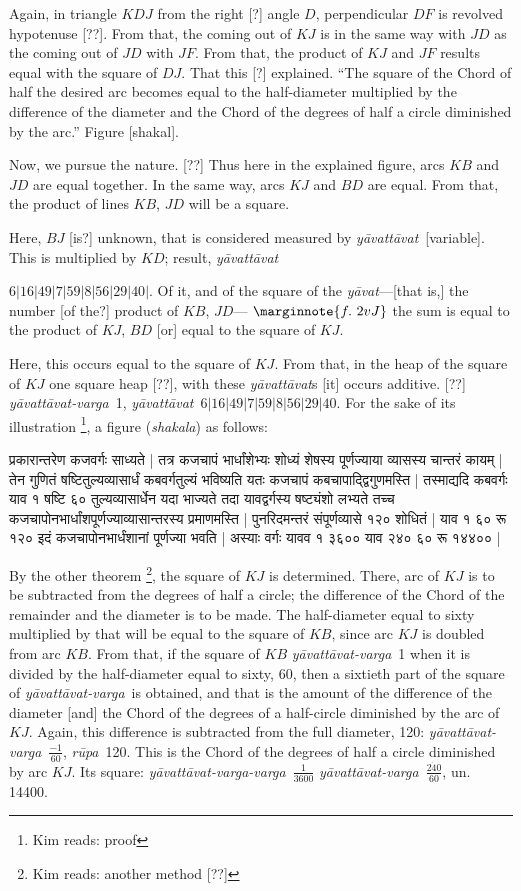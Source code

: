 \documentclass[12pt]{book}
\def\ya{\textit{y\=avat\-t\=avat}}
\def\yava{\textit{y\=avat\-t\=avat-varga}}
\def\yavava{\textit{y\=avat\-t\=avat-varga-varga}}
\def\ru{\textit{r\=upa}}
\begin{document}
\newpage

Again, in triangle $KDJ$ from the right [?] angle $D$, perpendicular $DF$ 
is revolved hypotenuse [??].  From that, the coming out of $KJ$ is in the same
way with $JD$ as the coming out of $JD$ with $JF$. 
From that, the product of $KJ$ and $JF$ results equal with the square of 
$DJ$. That this [?] explained. ``The square of the Chord of half the desired arc
becomes equal to the half-diameter multiplied by the difference of the 
diameter and the Chord of the degrees of half a circle diminished by the arc.''
Figure [shakal]. 

Now, we pursue the nature.  [??] Thus here in the explained figure, arcs
$KB$ and $JD$ are equal together. In the same way, arcs $KJ$ and  $BD$ 
are equal.  From that, the product of lines $KB$, $JD$ will be a square.

Here, $BJ$ [is?] unknown, that is considered measured by \ya\ [variable]. 
This is multiplied by $KD$; result, \ya\ 

$6|16|49|7|59|8|56|29|40|$. 
Of it, and of the square of the \textit{y\=avat}---[that is,] 
the number [of the?] product of $KB$, $JD$---
$\marginnote{f.~2v J}$ 
the sum is equal to the product of $KJ$, $BD$ [or] equal to the square of $KJ$.

Here, this occurs equal to the square of $KJ$. From that, in the heap of the
square of $KJ$ one square heap [??], with these \ya s [it] occurs additive. [??]
\yava\ 1, \ya\ $6|16|49|7|59|8|56|29|40$. For the sake of its illustration \footnote{Kim reads: proof}, a figure
(\textit{shakala}) as follows: 

\newpage

{\s प्रकारान्तरेण कजवर्गः साध्यते | तत्र कजचापं
भार्धांशेभ्यः शोध्यं शेषस्य पूर्णज्याया व्यासस्य चान्तरं कायम् |
तेन
गुणितं षष्टितुल्यव्यासार्धं कबवर्गतुल्यं भविष्यति
यतः कजचापं
कबचापाद्द्विगुणमस्ति |
तस्माद्यदि कबवर्गः याव १ षष्टि ६० तुल्यव्यासार्धेन यदा
भाज्यते तदा यावद्वर्गस्य षष्ट्यंशो लभ्यते तच्च
कजचापोनभार्धांशपूर्णज्याव्यासान्तरस्य प्रमाणमस्ति | पुनरिदमन्तरं
संपूर्णव्यासे १२० शोधितं | याव १ ६० रू १२० इदं
कजचापोनभार्धंशानां पूर्णज्या भवति |
अस्याः वर्गः यावव १ ३६०० याव
२४० ६० रू १४४०० |}

\newpage

By the other theorem \footnote{Kim reads: another method [??]}, the square of $KJ$ is determined.  There, arc of $KJ$ 
is to be subtracted from the degrees of half a circle; the difference of the Chord of the
remainder and the diameter is to be made. The half-diameter equal to sixty 
multiplied by that will be equal to the square of $KB$, since arc $KJ$
is doubled from arc $KB$.  From that, if the square of $KB$ \yava\ 1 when it is
divided by the half-diameter equal to sixty, 60, then a sixtieth part of the square of
\yava\ is obtained, and that is the amount of the difference
of the diameter [and] the Chord of the degrees of a half-circle
diminished by the arc of $KJ$.  Again, this difference is subtracted from the full diameter, 120: \yava\ $\frac{{-1}}{60}$, \ru\ 120. This is the
Chord of the degrees of half a circle diminished by arc $KJ$. 
Its square: \yavava\ $\frac{1}{3600}$ \yava\ $\frac{\dot{240}}{60}$, un. 14400. 
\end{document}
